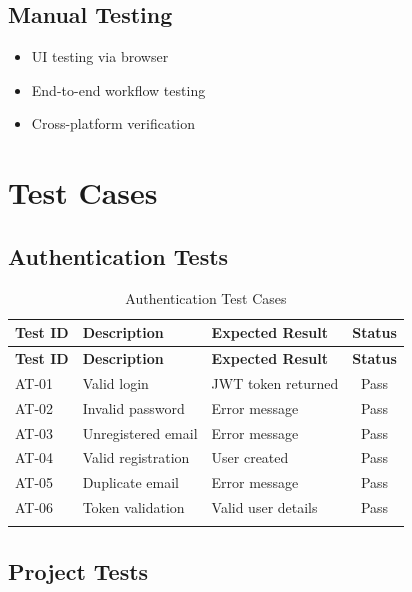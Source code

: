 \documentclass[12pt,a4paper,twoside]{book}
\begin{document}
\subsection{Manual Testing}
\begin{itemize}
    \item UI testing via browser
    \item End-to-end workflow testing
    \item Cross-platform verification
\end{itemize}

\section{Test Cases}

\subsection{Authentication Tests}

\begin{longtable}{|l|p{4cm}|p{3cm}|c|}
\hline
\textbf{Test ID} & \textbf{Description} & \textbf{Expected Result} & \textbf{Status} \\ \hline
\endfirsthead
\hline
\textbf{Test ID} & \textbf{Description} & \textbf{Expected Result} & \textbf{Status} \\ \hline
\endhead
AT-01 & Valid login & JWT token returned & Pass \\ \hline
AT-02 & Invalid password & Error message & Pass \\ \hline
AT-03 & Unregistered email & Error message & Pass \\ \hline
AT-04 & Valid registration & User created & Pass \\ \hline
AT-05 & Duplicate email & Error message & Pass \\ \hline
AT-06 & Token validation & Valid user details & Pass \\ \hline
\caption{Authentication Test Cases}
\end{longtable}

\subsection{Project Tests}
\end{document}
